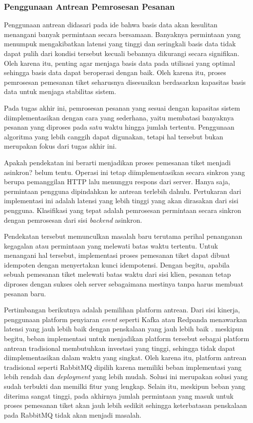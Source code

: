 \subsubsection{Penggunaan Antrean Pemrosesan Pesanan}

Penggunaan antrean didasari pada ide bahwa basis data akan kesulitan menangani banyak permintaan secara bersamaan. Banyaknya permintaan yang menumpuk mengakibatkan latensi yang tinggi dan seringkali basis data tidak dapat pulih dari kondisi tersebut kecuali bebannya dikurangi secara signifikan. Oleh karena itu, penting agar menjaga basis data pada utilisasi yang optimal sehingga basis data dapat beroperasi dengan baik. Oleh karena itu, proses pemrosesan pemesanan tiket seharusnya disesuaikan berdasarkan kapasitas basis data untuk menjaga stabilitas sistem.

Pada tugas akhir ini, pemrosesan pesanan yang sesuai dengan kapasitas sistem diimplementasikan dengan cara yang sederhana, yaitu membatasi banyaknya pesanan yang diproses pada satu waktu hingga jumlah tertentu. Penggunaan algoritma yang lebih canggih dapat digunakan, tetapi hal tersebut bukan merupakan fokus dari tugas akhir ini.

Apakah pendekatan ini berarti menjadikan proses pemesanan tiket menjadi asinkron? belum tentu. Operasi ini tetap diimplementasikan secara sinkron yang berupa pemanggilan HTTP lalu menunggu respons dari server. Hanya saja, permintaan pengguna dipindahkan ke antrean terlebih dahulu. Pertukaran dari implementasi ini adalah latensi yang lebih tinggi yang akan dirasakan dari sisi pengguna. Klasifikasi yang tepat adalah pemrosesan permintaan secara sinkron dengan pemrosesan dari sisi \textit{backend} asinkron.

Pendekatan tersebut memunculkan masalah baru terutama perihal penanganan kegagalan atau permintaan yang melewati batas waktu tertentu. Untuk menangani hal tersebut, implementasi proses pemesanan tiket dapat dibuat idempoten dengan menyertakan kunci idempotensi. Dengan begitu, apabila sebuah pemesanan tiket melewati batas waktu dari sisi klien, pesanan tetap diproses dengan sukses oleh server sebagaimana mestinya tanpa harus membuat pesanan baru.

Pertimbangan berikutnya adalah pemilihan platform antrean. Dari sisi kinerja, penggunaan platform penyiaran \textit{event} seperti Kafka atau Redpanda menawarkan latensi yang jauh lebih baik dengan penskalaan yang jauh lebih baik \parencite{comparingKafkaAlternatives}. meskipun begitu, beban implementasi untuk menjadikan platform tersebut sebagai platform antrean tradisional membutuhkan investasi yang tinggi, sehingga tidak dapat diimplementasikan dalam waktu yang singkat. Oleh karena itu, platform antrean tradisional seperti RabbitMQ dipilih karena memiliki beban implementasi yang lebih rendah dan \textit{deployment} yang lebih mudah. Solusi ini merupakan solusi yang sudah terbukti dan memilki fitur yang lengkap. Selain itu, meskipun beban yang diterima sangat tinggi, pada akhirnya jumlah permintaan yang masuk untuk proses pemesanan tiket akan jauh lebih sedikit sehingga keterbatasan penskalaan pada RabbitMQ tidak akan menjadi masalah.
